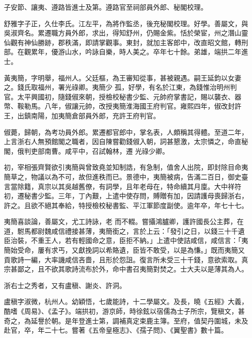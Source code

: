 \begin{pinyinscope}
 子安節、讓夷、遵路皆進士及第。遵路官至祠部員外郎、秘閣校理。



 舒雅字子正，久仕李氏。江左平，為將作監丞，後充秘閣校理。好學。善屬文，與吳淑齊名。累遷職方員外郎，求出，得知舒州，仍賜金紫。恬於榮宦，州之潛山靈仙觀有神仙勝跡，郡秩滿，即請掌觀事。東封，就加主客郎中，改直昭文館，轉刑部。在觀累年，優游山水，吟詠自樂，時人美之。卒年七十餘。弟雄，端拱二年進士。



 黃夷簡，字明舉，福州人。父廷樞，為王審知從事，甚被親遇。嗣王延鈞以女妻之。錢氏取福州，署光祿卿。夷簡少
 孤，好學，有名於江東，為錢惟治明州判官。太平興國初，隨錢俶來朝，授檢校秘書少監、元帥府掌書記，賜以襲衣、器幣、鞍勒馬。八年，俶讓元帥，改授夷簡淮海國王府判官。雍熙四年，俶改封許王，出鎮南陽，加夷簡倉部員外郎，充許王府判官。



 俶薨，歸朝，為考功員外郎。累遷都官郎中，掌名表，人頗稱其得體。至道二年，上言浙右人無預館閣之職者，因自陳嘗勸錢俶入朝，詞甚懇激，太宗憐之，命直秘閣，俄判吏部南曹。咸平中，召試翰林，遷
 光祿少卿。



 初，宰相張齊賢欲引夷簡與曾致堯並知制誥，有急制，值舍人出院，即封除目命夷簡草之，物議以為不可，故但進秩而已。景德中，夷簡被病，告滿二百日，御史臺言當除籍，真宗以其吳越舊僚，有詞學，且年老母在，特命續其月廩。大中祥符初，遷秘書少監。三年，丁內艱，上遣中使存問，賻贈有加，因請護母喪歸浙右，許之。且欲不絕其奉給，特授檢校秘書監、平江軍節度副使。逾年卒，年七十七。



 夷簡喜談論，善屬文，尤工詩詠，老
 而不輟。嘗攝鴻臚卿，護許國長公主葬，在道，駙馬都尉魏咸信禮接甚薄，夷簡銜之，言於上云：「發引之日，以錢三十千遺臣治裝，不重王人，若有輕國命之意，臣拒不納。」上遣中使詰咸信，咸信言：「夷簡始受命，屢有求丐，又獻挽詞以希賂遺，臣皆不敢受，以是為慊。」既而夷簡又貢歌詩一編，大率譏咸信吝嗇，且形於怨詛。復言所未受三十千錢，意欲索取。真宗甚鄙之，且不欲其歌詩流布於外，命中書召夷簡對焚之。士大夫以是薄其為人。



 浙右士之秀者，又有盧稹、謝炎、許洞。



 盧稹字淑微，杭州人。幼穎悟，七歲能詩，十二學屬文。及長，曉《五經》大義，酷嗜《周易》、《孟子》。端拱初，游京師，時徐鉉以宿儒為士子所宗，覽稹文，甚奇之，為延譽於朝。是年登進士第，調補真定束鹿主簿。至府，值契丹圍城，未及赴官，卒，年二十七。嘗著《五帝皇極志》、《孺子問》、《翼聖書》數十篇。




\end{pinyinscope}
